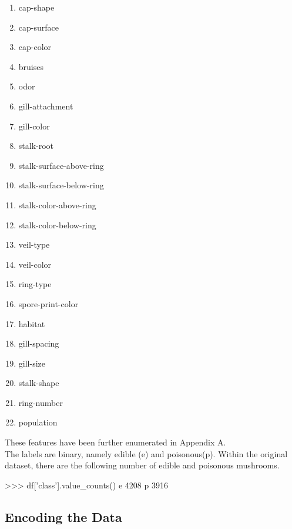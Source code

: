 \documentclass[fleqn]{article}
\begin{document}
    \begin{multicols}{3}
        \begin{enumerate}
            \item cap-shape
            \item cap-surface
            \item cap-color
            \item bruises
            \item odor
            \item gill-attachment
            \item gill-color
            \item stalk-root
            \item stalk-surface-above-ring
            \item stalk-surface-below-ring
            \item stalk-color-above-ring
            \item stalk-color-below-ring
            \item veil-type
            \item veil-color
            \item ring-type
            \item spore-print-color
            \item habitat
            \item gill-spacing
            \item gill-size
            \item stalk-shape
            \item ring-number
            \item population
        \end{enumerate}
    \end{multicols}
    \noindent
    These features have been further enumerated in Appendix A.\\

    The labels are binary, namely edible (e) and poisonous(p). Within the original dataset,
    there are the following number of edible and poisonous mushrooms.

    \begin{python}
    >>> df['class'].value_counts()
    e    4208
    p    3916
    \end{python}

    \subsection{Encoding the Data}
\end{document}
